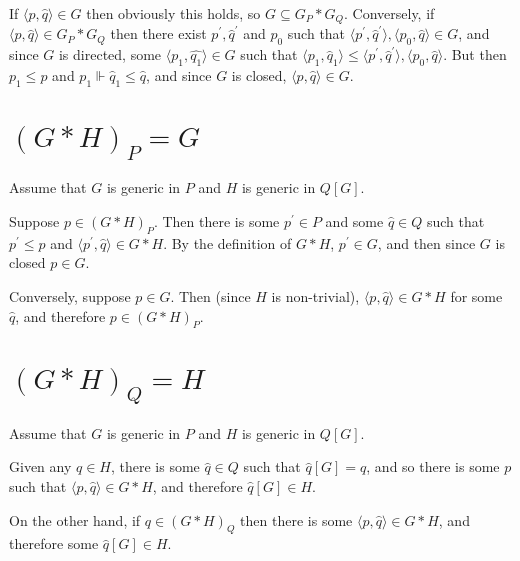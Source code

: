 \documentclass[12pt]{article}
\begin{document}
If $\langle p,\hat{q}\rangle\in G$ then obviously this holds, so $G\subseteq G_P*G_Q$.  Conversely, if $\langle p,\hat{q}\rangle\in G_P*G_Q$ then there exist $p^\prime,\hat{q}^\prime$ and $p_0$ such that $\langle p^\prime,\hat{q}^\prime\rangle,\langle p_0,\hat{q}\rangle\in G$, and since $G$ is directed, some $\langle p_1,\hat{q_1}\rangle\in G$ such that $\langle p_1,\hat{q}_1\rangle\leq\langle p^\prime,\hat{q}^\prime\rangle,\langle p_0,\hat{q}\rangle$.  But then $p_1\leq p$ and $p_1\Vdash \hat{q}_1\leq\hat{q}$, and since $G$ is closed, $\langle p,\hat{q}\rangle\in G$.

\section*{$(G*H)_P=G$}

Assume that $G$ is generic in $P$ and $H$ is generic in $Q[G]$.

Suppose $p\in (G*H)_P$.  Then there is some $p^\prime\in P$ and some $\hat{q}\in Q$ such that $p^\prime\leq p$ and $\langle p^\prime,\hat{q}\rangle\in G*H$.  By the definition of $G*H$, $p^\prime\in G$, and then since $G$ is closed $p\in G$.

Conversely, suppose $p\in G$.  Then (since $H$ is non-trivial), $\langle p,\hat{q}\rangle\in G*H$ for some $\hat{q}$, and therefore $p\in (G*H)_P$.

\section*{$(G*H)_Q=H$}

Assume that $G$ is generic in $P$ and $H$ is generic in $Q[G]$.

Given any $q\in H$, there is some $\hat{q}\in Q$ such that $\hat{q}[G]=q$, and so there is some $p$ such that $\langle p,\hat{q}\rangle\in G*H$, and therefore $\hat{q}[G]\in H$.

On the other hand, if $q\in (G*H)_Q$ then there is some $\langle p,\hat{q}\rangle\in G*H$, and therefore some $\hat{q}[G]\in H$.
\end{document}
